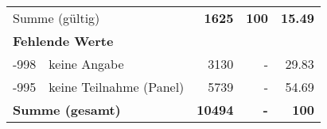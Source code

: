 \begin{longtable}{lXrrr}
     \midrule
     \multicolumn{2}{l}{Summe (gültig)} &
       \textbf{\num{1625}} &
     \textbf{100} &
       \textbf{\num[round-mode=places,round-precision=2]{15,49}} \\
     \multicolumn{5}{l}{\textbf{Fehlende Werte}}\\
       -998 &
       keine Angabe &
         \num{3130} &
        - &
         \num[round-mode=places,round-precision=2]{29,83} \\
       -995 &
       keine Teilnahme (Panel) &
         \num{5739} &
        - &
         \num[round-mode=places,round-precision=2]{54,69} \\
     \midrule
     \multicolumn{2}{l}{\textbf{Summe (gesamt)}} &
          \textbf{\num{10494}} &
        \textbf{-} &
        \textbf{100} \\
     \bottomrule
     \end{longtable}
     
